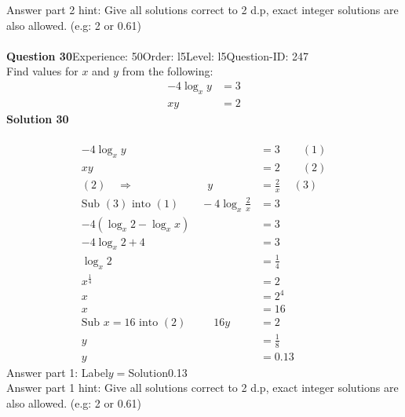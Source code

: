 \documentclass{article}
\begin{document}
Answer part 2 hint: \hspace{15pt}Give all solutions correct to 2 d.p, exact integer solutions are also allowed. (e.g: 2 or 0.61)\\
\\[4pt]
\noindent\textbf{Question 30}\hspace{20pt}Experience: 50\hspace{20pt}Order: l5\hspace{20pt}Level: l5\hspace{20pt}Question-ID: 247\\[2pt]
Find values for $x$ and $y$ from the following:
\begin{align*}
-4\log_{x}y&=3\\[2pt]
xy&=2
\end{align*}
\noindent\textbf{Solution 30}\\[2pt]
\\[-35pt]\begin{align*}
-4\log_{x}y&=3\qquad (1)\\[2pt]
xy&=2\qquad (2)\\[2pt]
(2) \quad\Rightarrow\hspace{80pt} y&=\displaystyle\frac{2}{x}\hspace{14pt} (3)\\[2pt]
\text{Sub}\,\,(3)\,\,\text{into}\,\,(1)\qquad -4\log_{x}\displaystyle\frac{2}{x}&=3\\[2pt]
-4(\log_{x}2-\log_{x}x)&=3\\[2pt]
-4\log_{x}2+4&=3\\[2pt]
\log_{x}2&=\displaystyle\frac{1}{4}\\[2pt]
x^{\frac{1}{4}}&=2\\[2pt]
x&=2^4\\[2pt]
x&=16\\[12pt]
\text{Sub}\,\,x=16\,\,\text{into}\,\,(2)\hspace{30pt}16y&=2\\[2pt]
y&=\displaystyle\frac{1}{8}\\[2pt]
y&=0.13
\end{align*}
Answer part 1: \hspace{10pt}Label\hspace{10pt}$y=$\hspace{10pt}Solution\hspace{10pt}0.13\\
Answer part 1 hint: \hspace{15pt}Give all solutions correct to 2 d.p, exact integer solutions are also allowed. (e.g: 2 or 0.61)\\
\end{document}
